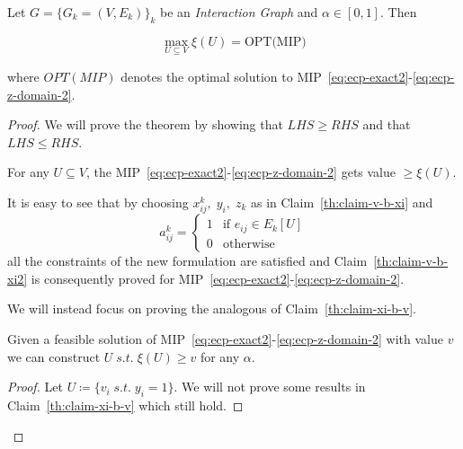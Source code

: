 \begin{theorem}
	\label{th:ecp-mip}
	Let $G = \{G_k = (V,E_k) \}_k$ be an \emph{Interaction Graph} and $\alpha \in
		[0, 1]$. Then

	\begin{equation}
		\max_{U \subseteq V} \xi(U) = \text{OPT(MIP)}
	\end{equation}

	where $OPT(MIP)$ denotes the optimal solution to
	MIP~\eqref{eq:ecp-exact2}-\eqref{eq:ecp-z-domain-2}.
\end{theorem}
\begin{proof}
	We will prove the theorem by showing that $LHS \geq RHS$ and that $LHS \leq
		RHS$.
	\begin{claim}
		\label{th:claim-v-b-xi2}
		For any $U \subseteq V$, the
		MIP~\eqref{eq:ecp-exact2}-\eqref{eq:ecp-z-domain-2} gets value $\geq \xi(U)$.
	\end{claim}

	It is easy to see that by choosing $x_{ij}^{k}, \; y_i, \; z_k$ as in
	Claim~\ref{th:claim-v-b-xi} and
	\begin{equation*}
		a_{ij}^{k} = \begin{cases}
			1 & \text{if } e_{ij} \in E_k[U] \\
			0 & \text{otherwise}
		\end{cases}
	\end{equation*}
	all the constraints of the new formulation are satisfied and
	Claim~\ref{th:claim-v-b-xi2} is consequently proved for
	MIP~\eqref{eq:ecp-exact2}-\eqref{eq:ecp-z-domain-2}.

	We will instead focus on proving the analogous of Claim~\ref{th:claim-xi-b-v}.
	\begin{claim}
		\label{th:claim-xi-b-v2}
		Given a feasible solution of
		MIP~\eqref{eq:ecp-exact2}-\eqref{eq:ecp-z-domain-2} with value $v$ we can
		construct $U \; s.t. \; \xi(U) \geq v$ for any $\alpha$.
	\end{claim}

	\begin{proof}
		Let $U \coloneqq \{ v_i \; s.t. \; y_i = 1\} $. We will not prove
		some results in Claim~\ref{th:claim-xi-b-v} which still hold.


\end{proof}
\end{proof}

